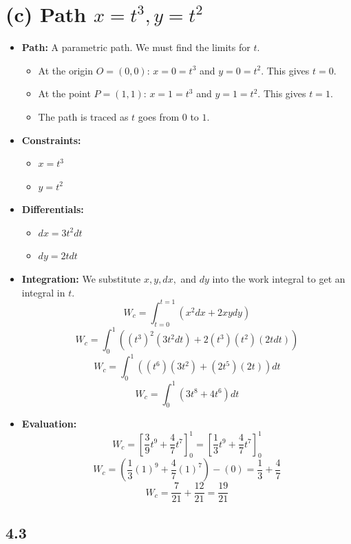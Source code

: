 \documentclass[11pt, a4paper]{article} %
\begin{document}
\hrulefill

\section*{(c) Path $x = t^3, y = t^2$}

\begin{itemize}
    \item \textbf{Path:} A parametric path. We must find the limits for $t$.
    \begin{itemize}
        \item At the origin $O=(0,0)$: $x=0=t^3$ and $y=0=t^2$. This gives $t=0$.
        \item At the point $P=(1,1)$: $x=1=t^3$ and $y=1=t^2$. This gives $t=1$.
        \item The path is traced as $t$ goes from $0$ to $1$.
    \end{itemize}
    \item \textbf{Constraints:}
    \begin{itemize}
        \item $x = t^3$
        \item $y = t^2$
    \end{itemize}
    \item \textbf{Differentials:}
    \begin{itemize}
        \item $dx = 3t^2 dt$
        \item $dy = 2t dt$
    \end{itemize}
    \item \textbf{Integration:} We substitute $x, y, dx,$ and $dy$ into the work integral to get an integral in $t$.
    $$W_c = \int_{t=0}^{t=1} (x^2 dx + 2xy dy)$$
    $$W_c = \int_0^1 \left( (t^3)^2 (3t^2 dt) + 2(t^3)(t^2) (2t dt) \right)$$
    $$W_c = \int_0^1 \left( (t^6)(3t^2) + (2t^5)(2t) \right) dt$$
    $$W_c = \int_0^1 (3t^8 + 4t^6) dt$$
    \item \textbf{Evaluation:}
    $$W_c = \left[ \frac{3}{9}t^9 + \frac{4}{7}t^7 \right]_0^1 = \left[ \frac{1}{3}t^9 + \frac{4}{7}t^7 \right]_0^1$$
    $$W_c = \left( \frac{1}{3}(1)^9 + \frac{4}{7}(1)^7 \right) - (0) = \frac{1}{3} + \frac{4}{7}$$
    $$W_c = \frac{7}{21} + \frac{12}{21} = \frac{19}{21}$$
\end{itemize}

\newpage
\subsection*{4.3}
\end{document}
